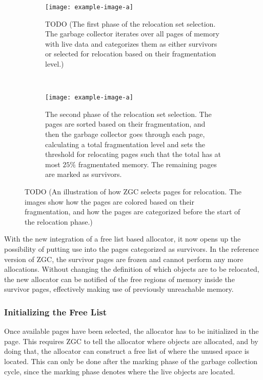 \begin{figure}[H]
    \centering
    \begin{subfigure}[b]{0.6\textwidth}
        \texttt{[image: example-image-a]}
        \caption{TODO (The first phase of the relocation set selection. The garbage collector iterates over all pages of memory with live data and categorizes them as either survivors or selected for relocation based on their fragmentation level.)}
        \label{fig:rel_set_selector1}
    \end{subfigure}
    \\
    \begin{subfigure}[b]{0.6\textwidth}
        \texttt{[image: example-image-a]}
        \caption{The second phase of the relocation set selection. The pages are sorted based on their fragmentation, and then the garbage collector goes through each page, calculating a total fragmentation level and sets the threshold for relocating pages such that the total has at most $25\%$ fragmentated memory. The remaining pages are marked as survivors.}
        \label{fig:rel_set_selector2}
    \end{subfigure}
    \caption{TODO (An illustration of how ZGC selects pages for relocation. The images show how the pages are colored based on their fragmentation, and how the pages are categorized before the start of the relocation phase.)}
    \label{fig:rel_set_selector}
\end{figure} 

With the new integration of a free list based allocator, it now opens up the possibility of putting use into the pages categorized as survivors. In the reference version of ZGC, the survivor pages are frozen and cannot perform any more allocations. Without changing the definition of which objects are to be relocated, the new allocator can be notified of the free regions of memory inside the survivor pages, effectively making use of previously unreachable memory.

\subsubsection{Initializing the Free List}
Once available pages have been selected, the allocator has to be initialized in the page. This requires ZGC to tell the allocator where objects are allocated, and by doing that, the allocator can construct a free list of where the unused space is located. This can only be done after the marking phase of the garbage collection cycle, since the marking phase denotes where the live objects are located. 

